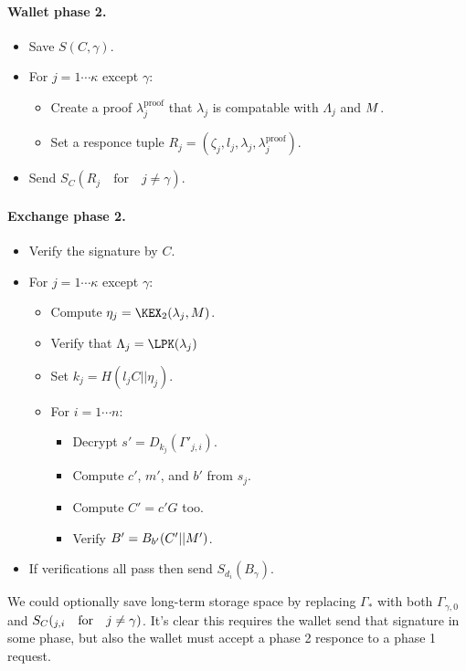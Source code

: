 \documentclass{llncs}
\begin{document}
\paragraph{Wallet phase 2.}
\begin{itemize}
\item  Save $S(C,\gamma)$.
\item  For $j = 1 \cdots \kappa$ except $\gamma$:
   \begin{itemize}
   \item  Create a proof $\lambda_j^{\textrm{proof}}$ that
          $\lambda_j$ is compatable with $\Lambda_j$ and $M$.
   \item  Set a responce tuple
          $R_j = (\zeta_j,l_j,\lambda_j,\lambda_j^{\textrm{proof}})$.
   \end{itemize}
\item  Send $S_C(R_j \quad\textrm{for}\quad j \ne \gamma )$.
\end{itemize}

\paragraph{Exchange phase 2.}
\begin{itemize}
\item  Verify the signature by $C$.
\item  For $j = 1 \cdots \kappa$ except $\gamma$:
   \begin{itemize}
   \item  Compute $\eta_j = \KEX_2(\lambda_j,\Mu)$.
   \item  Verify that $\Lambda_j = \LPK(\lambda_j)$
   \item  Set $k_j = H(l_j C || \eta_j)$.
   \item  For $i=1 \cdots n$:
     \begin{itemize}
     \item  Decrypt $s' = D_{k_j}(\Gamma'_{j,i})$.
     \item  Compute $c'$, $m'$, and $b'$ from $s_j$.
     \item  Compute $C' = c' G$ too.
     \item  Verify $B' = B_{b'}(C' || M')$.
     \end{itemize}
   \end{itemize}
\item  If verifications all pass then send $S_{d_i}(B_\gamma)$.
\end{itemize}

We could optionally save long-term storage space by
replacing $\Gamma_*$ with both $\Gamma_{\gamma,0}$ and
 $S_C(_{j,i} \quad\textrm{for}\quad j \ne \gamma )$.
It's clear this requires the wallet send that signature in some phase,
but also the wallet must accept a phase 2 responce to a phase 1 request.
\end{document}
